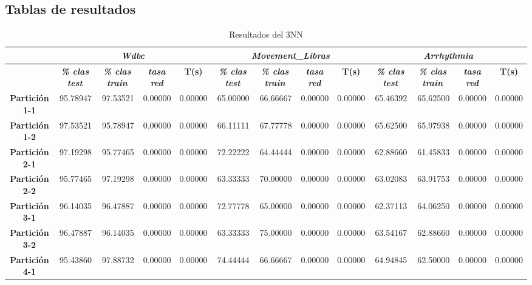 \documentclass[a4paper,11pt]{article}
\begin{document}
 \subsection{Tablas de resultados}
 \begin{table}[H]	
  \caption{Resultados del 3NN}
  \begin{adjustbox}{width=1.1\textwidth}
  \begin{tabular}{|c|r|r|r|r|r|r|r|r|r|r|r|r|}
  \hline
  \multicolumn{1}{|l|}{} & \multicolumn{ 4}{c|}{\textbf{\textit{Wdbc}}} & \multicolumn{ 4}{c|}{\textbf{\textit{Movement\_Libras}}} & \multicolumn{ 4}{c|}{\textbf{\textit{Arrhythmia}}} \\ \hline
  & \multicolumn{1}{c|}{\textbf{\textit{\% clas test}}} & \multicolumn{1}{c|}{\textbf{\textit{\% clas train}}} & \multicolumn{1}{c|}{\textbf{\textit{tasa red}}} & \multicolumn{1}{c|}{\textbf{T(s)}} & \multicolumn{1}{c|}{\textbf{\textit{\% clas test}}} & \multicolumn{1}{c|}{\textbf{\textit{\% clas train}}} & \multicolumn{1}{c|}{\textbf{\textit{tasa red}}} & \multicolumn{1}{c|}{\textbf{T(s)}} & \multicolumn{1}{c|}{\textbf{\textit{\% clas test}}} & \multicolumn{1}{c|}{\textbf{\textit{\% clas train}}} & \multicolumn{1}{c|}{\textbf{\textit{tasa red}}} & \multicolumn{1}{c|}{\textbf{T(s)}} \\ \hline
  \textbf{Partición 1-1} & 95.78947 & 97.53521 & 0.00000 & 0.00000 & 65.00000 & 66.66667 & 0.00000 & 0.00000 & 65.46392 & 65.62500 & 0.00000 & 0.00000 \\ \hline
  \textbf{Partición 1-2} & 97.53521 & 95.78947 & 0.00000 & 0.00000 & 66.11111 & 67.77778 & 0.00000 & 0.00000 & 65.62500 & 65.97938 & 0.00000 & 0.00000 \\ \hline
  \textbf{Partición 2-1} & 97.19298 & 95.77465 & 0.00000 & 0.00000 & 72.22222 & 64.44444 & 0.00000 & 0.00000 & 62.88660 & 61.45833 & 0.00000 & 0.00000 \\ \hline
  \textbf{Partición 2-2} & 95.77465 & 97.19298 & 0.00000 & 0.00000 & 63.33333 & 70.00000 & 0.00000 & 0.00000 & 63.02083 & 63.91753 & 0.00000 & 0.00000 \\ \hline
  \textbf{Partición 3-1} & 96.14035 & 96.47887 & 0.00000 & 0.00000 & 72.77778 & 65.00000 & 0.00000 & 0.00000 & 62.37113 & 64.06250 & 0.00000 & 0.00000 \\ \hline
  \textbf{Partición 3-2} & 96.47887 & 96.14035 & 0.00000 & 0.00000 & 63.33333 & 75.00000 & 0.00000 & 0.00000 & 63.54167 & 62.88660 & 0.00000 & 0.00000 \\ \hline
  \textbf{Partición 4-1} & 95.43860 & 97.88732 & 0.00000 & 0.00000 & 74.44444 & 66.66667 & 0.00000 & 0.00000 & 64.94845 & 62.50000 & 0.00000 & 0.00000 \\ \hline

\end{tabular}
\end{adjustbox}
\end{table}
\end{document}
